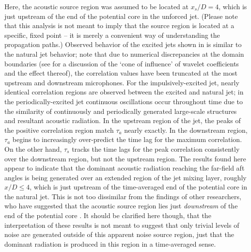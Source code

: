 Here, the acoustic source region was assumed to be located at $x_s /D = 4$, which is just upstream of the end of the potential core in the unforced jet. 
(Please note that this analysis is not meant to imply that the source region is located at a specific, fixed point – it is merely a convenient way of understanding the propagation paths.)
Observed behavior of the excited jets shown in  is similar to the natural jet behavior; note that due to numerical discrepancies at the domain boundaries (see \citet{Torrence1998} for a discussion of the `cone of influence' of wavelet coefficients and the effect thereof), the correlation values have been truncated at the most upstream and downstream microphones.
For the impulsively-excited jet, nearly identical correlation regions are observed between the excited and natural jet; in the periodically-excited jet continuous oscillations occur throughout time due to the similarity of continuously and periodically generated large-scale structures and resultant acoustic radiation.
In the upstream region of the jet, the peaks of the positive correlation region match $\tau_a$ nearly exactly. 
In the downstream region, $\tau_a$ begins to increasingly over-predict the time lag for the maximum correlation. 
On the other hand, $\tau_s$ tracks the time lags for the peak correlation consistently over the downstream region, but not the upstream region. 
The results found here appear to indicate that the dominant acoustic radiation reaching the far-field aft angles is being generated over an extended region of the jet mixing layer, roughly $x/D \leq 4$, which is just upstream of the time-averaged end of the potential core in the natural jet.
This is not too dissimilar from the findings of other researchers, who have suggested that the acoustic source region lies just \textit{downstream} of the end of the potential core \citep{Hileman2005}.
It should be clarified here though, that the interpretation of these results is not meant to suggest that only trivial levels of noise are generated outside of this apparent noise source region, just that the dominant radiation is produced in this region in a time-averaged sense.

